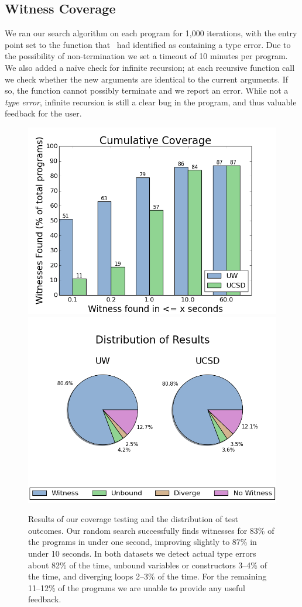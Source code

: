 \subsection{Witness Coverage}
\label{sec:eval:witness-coverage}
%
We ran our search algorithm on each program for 1,000 iterations, with
the entry point set to the function that \ocaml\ had identified as
containing a type error.
%
Due to the possibility of non-termination we set a timeout of 10 minutes
per program.
%
%
We also added a na\"ive check for infinite recursion; at each recursive
function call we check whether the new arguments are identical to the
current arguments.
%
If so, the function cannot possibly terminate and we report an error.
%
While not a \emph{type error}, infinite recursion is still a clear bug
in the program, and thus valuable feedback for the user.

\begin{figure}[t]
\centering
\begin{minipage}{\linewidth}
\centering
\includegraphics[width=0.49\linewidth]{coverage.png}
\includegraphics[width=0.49\linewidth]{distrib.png}
\end{minipage}
\caption{Results of our coverage testing and the distribution of test
  outcomes. Our random search successfully finds witnesses for 83\% of
  the programs in under one second, improving slightly to 87\% in under
  10 seconds. In both datasets we detect actual type errors about 82\%
  of the time, unbound variables or constructors 3--4\% of the time, and
  diverging loops 2--3\% of the time. For the remaining 11--12\% of the
  programs we are unable to provide any useful feedback.  }
\label{fig:results-witness}
\end{figure}

